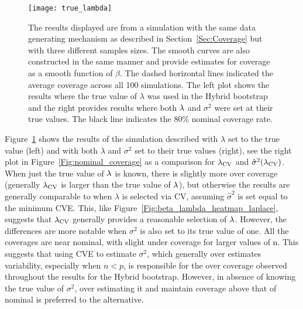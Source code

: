 \begin{appendices}
\begin{figure}[hbtp]
  \begin{center}
  \texttt{[image: true\_lambda]}
  \caption{\label{Fig:true_lambda} The results displayed are from a simulation with the same data generating mechanism as described in Section~\ref{Sec:Coverage} but with three different samples sizes. The smooth curves are also constructed in the same manner and provide estimates for coverage as a smooth function of $\beta$. The dashed horizontal lines indicated the average coverage across all 100 simulations. The left plot shows the results where the true value of $\lambda$ was used in the Hybrid bootstrap and the right provides results where both $\lambda$ and $\sigma^2$ were set at their true values. The black line indicates the 80\% nominal coverage rate.}
  \end{center}
\end{figure}

Figure~\ref{Fig:true_lambda} shows the results of the simulation described with $\lambda$ set to the true value (left) and with both $\lambda$ and $\sigma^2$ set to their true values (right), see the right plot in Figure~\ref{Fig:nominal_coverage} as a comparison for $\lambda_{\textrm{CV}}$ and $\hat{\sigma}^2(\lambda_{\textrm{CV}})$. When just the true value of $\lambda$ is known, there is slightly more over coverage (generally $\lambda_{\textrm{CV}}$ is larger than the true value of $\lambda$), but otherwise the results are generally comparable to when $\lambda$ is selected via CV, assuming $\hat{\sigma}^2$ is set equal to the minimum CVE. This, like Figure~\ref{Fig:beta_lambda_heatmap_laplace}, suggests that $\lambda_{\textrm{CV}}$ generally provides a reasonable selection of $\lambda$. However, the differences are more notable when $\sigma^2$ is also set to its true value of one. All the coverages are near nominal, with slight under coverage for larger values of n. This suggests that using CVE to estimate $\sigma^2$, which generally over estimates variability, especially when $n < p$, is responsible for the over coverage observed throughout the results for the Hybrid bootstrap. However, in absence of knowing the true value of $\sigma^2$, over estimating it and maintain coverage above that of nominal is preferred to the alternative. 




\end{appendices}
